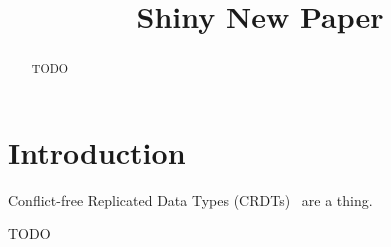 \documentclass[sigconf,review,authordraft]{acmart}
\begin{document}
\title{Shiny New Paper}

\begin{abstract}
TODO
\end{abstract}

\maketitle

\section{Introduction}

Conflict-free Replicated Data Types (CRDTs)~\cite{Shapiro:2011} are a thing.

\begin{acks}
TODO
\end{acks}



\end{document}
